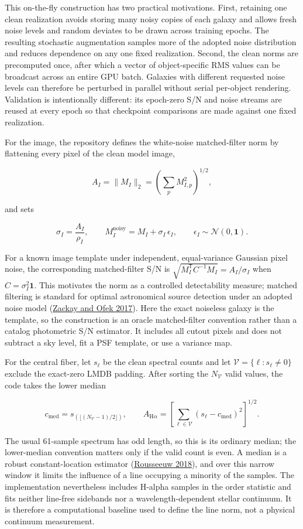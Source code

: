 \documentclass[11pt]{article}
\begin{document}
This on-the-fly construction has two practical motivations. First, retaining
one clean realization avoids storing many noisy copies of each galaxy and
allows fresh noise levels and random deviates to be drawn across training
epochs. The resulting stochastic augmentation samples more of the adopted
noise distribution and reduces dependence on any one fixed realization.
Second, the clean norms are precomputed once, after which a vector of
object-specific RMS values can be broadcast across an entire GPU batch.
Galaxies with different requested noise levels can therefore be perturbed in
parallel without serial per-object rendering. Validation is intentionally
different: its epoch-zero S/N and noise streams are reused at every epoch so
that checkpoint comparisons are made against one fixed realization.

For the image, the repository defines the white-noise matched-filter norm by
flattening every pixel of the clean model image,

\[
A_I=\lVert M_I\rVert_2
=\left(\sum_p M_{I,p}^2\right)^{1/2},
\]

and sets

\[
\sigma_I=\frac{A_I}{\rho_I},
\qquad
M_I^\mathrm{noisy}=M_I+\sigma_I\,\epsilon_I,
\qquad
\epsilon_I\sim\mathcal N(0,\mathbf 1).
\]

For a known image template under independent, equal-variance Gaussian pixel
noise, the corresponding matched-filter S/N is
\(\sqrt{M_I^\mathsf{T}C^{-1}M_I}=A_I/\sigma_I\) when
\(C=\sigma_I^2\mathbf 1\). This motivates the norm as a controlled
detectability measure; matched filtering is standard for optimal astronomical
source detection under an adopted noise model
(\hyperlink{ref:zackay2017}{Zackay and Ofek 2017}). Here the exact noiseless galaxy is the
template, so the construction is an oracle matched-filter convention rather
than a catalog photometric S/N estimator. It includes all cutout pixels and
does not subtract a sky level, fit a PSF template, or use a variance map.

For the central fiber, let \(s_\ell\) be the clean spectral counts and let
\(\mathcal V=\{\ell:s_\ell\ne0\}\) exclude the exact-zero LMDB padding.
After sorting the \(N_\mathcal V\) valid values, the code takes the lower
median

\[
c_\mathrm{med}
=s_{(\lfloor(N_\mathcal V-1)/2\rfloor)},\qquad
A_{\mathrm{H}\alpha}
=\left[\sum_{\ell\in\mathcal V}
(s_\ell-c_\mathrm{med})^2\right]^{1/2}.
\]

The usual 61-sample spectrum has odd length, so this is its ordinary median;
the lower-median convention matters only if the valid count is even. A median
is a robust constant-location estimator (\hyperlink{ref:rousseeuw2018}{Rousseeuw 2018}),
and over this narrow window it limits the influence of a line occupying a
minority of the samples. The implementation nevertheless includes H-alpha
samples in the order statistic and fits neither line-free sidebands nor a
wavelength-dependent stellar continuum. It is therefore a computational
baseline used to define the line norm, not a physical continuum measurement.
\end{document}
